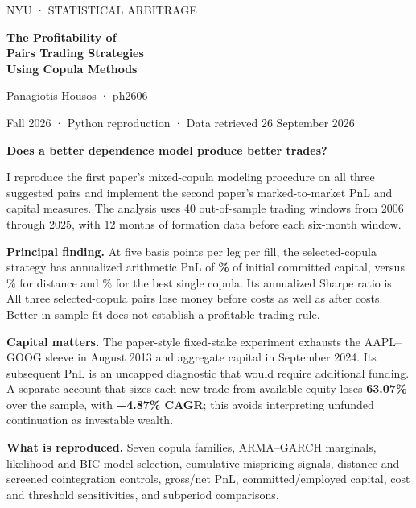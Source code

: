 \documentclass[11pt,letterpaper]{article}
\begin{document}
\thispagestyle{empty}
{\sffamily\color{teal}\large NYU · STATISTICAL ARBITRAGE\par}
\vspace{22pt}
{\sffamily\color{navy}\fontsize{31}{35}\selectfont\bfseries The Profitability of\\Pairs Trading Strategies\\Using Copula Methods\par}
\vspace{14pt}
{\large Panagiotis Housos · ph2606\par}
{\color{muted}Fall 2026 · Python reproduction · Data retrieved 26 September 2026\par}
\vspace{16pt}
{\sffamily\large\bfseries Does a better dependence model produce better trades?\par}
I reproduce the first paper's mixed-copula modeling procedure on all three suggested pairs and implement the second paper's marked-to-market PnL and capital measures. The analysis uses 40 out-of-sample trading windows from 2006 through 2025, with 12 months of formation data before each six-month window.

\vspace{7pt}
\colorbox{pale}{\parbox{\dimexpr\linewidth-2\fboxsep\relax}{\vspace{7pt}
\textbf{Principal finding.} At five basis points per leg per fill, the selected-copula strategy has annualized arithmetic PnL of \textbf{\SelectedAnnual\%} of initial committed capital, versus \DistanceAnnual\% for distance and \SingleAnnual\% for the best single copula. Its annualized Sharpe ratio is \SelectedSharpe. All three selected-copula pairs lose money before costs as well as after costs. Better in-sample fit does not establish a profitable trading rule.\vspace{7pt}}}

\vspace{10pt}
\textbf{Capital matters.} The paper-style fixed-stake experiment exhausts the AAPL--GOOG sleeve in August 2013 and aggregate capital in September 2024. Its subsequent PnL is an uncapped diagnostic that would require additional funding. A separate account that sizes each new trade from available equity loses \textbf{63.07\%} over the sample, with \textbf{−4.87\% CAGR}; this avoids interpreting unfunded continuation as investable wealth.

\textbf{What is reproduced.} Seven copula families, ARMA--GARCH marginals, likelihood and BIC model selection, cumulative mispricing signals, distance and screened cointegration controls, gross/net PnL, committed/employed capital, cost and threshold sensitivities, and subperiod comparisons.
\end{document}
